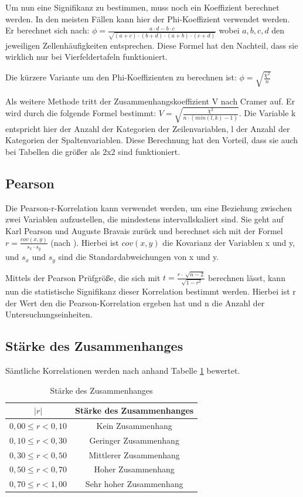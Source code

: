 Um nun eine Signifikanz zu bestimmen, muss noch ein Koeffizient berechnet werden. In den meisten Fällen kann hier der Phi-Koeffizient verwendet werden. Er berechnet sich nach: $\phi = \frac{a \cdot d - b \cdot c}{\sqrt{(a+c) \cdot (b+d) \cdot (a+b) \cdot (c+d)}}$
wobei $a, b, c, d$ den jeweiligen Zellenhäufigkeiten entsprechen. Diese Formel hat den Nachteil, dass sie wirklich nur bei Vierfeldertafeln funktioniert.

Die kürzere Variante um den Phi-Koeffizienten zu berechnen ist: $\phi = \sqrt{\frac{\chi^2}{n}}$

Als weitere Methode tritt der Zusammenhangskoeffizient V nach Cramer auf. Er wird durch die folgende Formel bestimmt: $V = \sqrt{\frac{\chi^2}{n \cdot (min(l,k) - 1)}}$. Die Variable k entspricht hier der Anzahl der Kategorien der Zeilenvariablen, l der Anzahl der Kategorien der Spaltenvariablen. Diese Berechnung hat den Vorteil, dass sie auch bei Tabellen die größer als 2x2 sind funktioniert.

\subsection{Pearson}
\label{pearson}
Die Pearson-r-Korrelation kann verwendet werden, um eine Beziehung zwischen zwei Variablen aufzustellen, die mindestens intervallskaliert sind. Sie geht auf Karl Pearson und Auguste Bravais zurück und berechnet sich mit der Formel\\$r = \frac{cov(x,y)}{s_x \cdot s_y}$ (nach \citet{statistikeinfuehrung}). Hierbei ist $cov(x,y)$ die Kovarianz der Variablen x und y, und $s_x$ und $s_y$ sind die Standardabweichungen von x und y.

Mittels der Pearson Prüfgröße, die sich mit $t = \frac{r \cdot \sqrt[]{n - 2}}{\sqrt[]{1 - r^2}}$ berechnen lässt, kann nun die statistische Signifikanz dieser Korrelation bestimmt werden. Hierbei ist r der Wert den die Pearson-Korrelation ergeben hat und n die Anzahl der Untersuchungseinheiten.

\subsection{Stärke des Zusammenhanges}
Sämtliche Korrelationen werden nach \citet{statistikeinfuehrung} anhand Tabelle \ref{correlationrelevance} bewertet.

\begin{table}
	\begin{tabular}[]{ c | c }
	$|r|$ & Stärke des Zusammenhanges\\\hline\hline
	$0,00 \leq r < 0,10$ & Kein Zusammenhang\\\hline
	$0,10 \leq r < 0,30$ & Geringer Zusammenhang\\\hline
	$0,30 \leq r < 0,50$ & Mittlerer Zusammenhang\\\hline
	$0,50 \leq r < 0,70$ & Hoher Zusammenhang\\\hline
	$0,70 \leq r < 1,00$ & Sehr hoher Zusammenhang\\\hline
	\end{tabular}
	\caption{Stärke des Zusammenhanges}\label{correlationrelevance}
\end{table}

